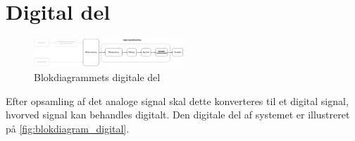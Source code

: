 \section{Digital del}
\begin{figure}[H]
\centering
\includegraphics[width=0.5\textwidth]{figures/implementering/Blokdiagram_digital.png}
\caption{Blokdiagrammets digitale del}
\label{fig:blokdiagram_digital}
\end{figure}

\noindent
Efter opsamling af det analoge signal skal dette konverteres til et digital signal, hvorved signal kan behandles digitalt. Den digitale del af systemet er illustreret på \autoref{fig:blokdiagram_digital}. 





